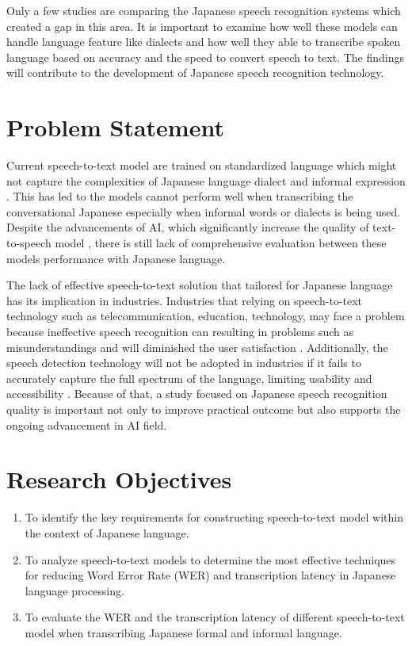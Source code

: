 Only a few studies are comparing the Japanese speech recognition systems which created a gap in this area. It is important to examine how well these models can handle language feature like dialects and how well they able to transcribe spoken language based on accuracy and the speed to convert speech to text. The findings will contribute to the development of Japanese speech recognition technology.


\section{Problem Statement}

Current speech-to-text model are trained on standardized language which might not capture the complexities of Japanese language dialect and informal expression \parencite{imaizumi2022}. This has led to the models cannot perform well when transcribing the conversational Japanese especially when informal words or dialects is being used. Despite the advancements of AI, which significantly increase the quality of text-to-speech model \parencite{Karita2021}, there is still lack of comprehensive evaluation between these models performance with Japanese language. 


The lack of effective speech-to-text solution that tailored for Japanese language has its implication in industries. Industries that relying on speech-to-text technology such as telecommunication, education, technology, may face a problem because ineffective speech recognition can resulting in problems such as misunderstandings and will diminished the user satisfaction \parencite{Sztahó2023}. Additionally, the speech detection technology will not be adopted in industries if it fails to accurately capture the full spectrum of the language, limiting usability and accessibility \parencite{widyana}. Because of that, a study focused on Japanese speech recognition quality is important not only to improve practical outcome but also supports the ongoing advancement in AI field. 


\section{Research Objectives}
\begin{enumerate}
    \item To identify the key requirements for constructing speech-to-text
    model within the context of Japanese language.
    
    \item To analyze speech-to-text models to determine the most effective techniques for reducing Word Error Rate (WER) and transcription latency in Japanese language processing.

    \item To evaluate the WER and the transcription latency of different speech-to-text model when transcribing Japanese formal and informal language.
\end{enumerate}


